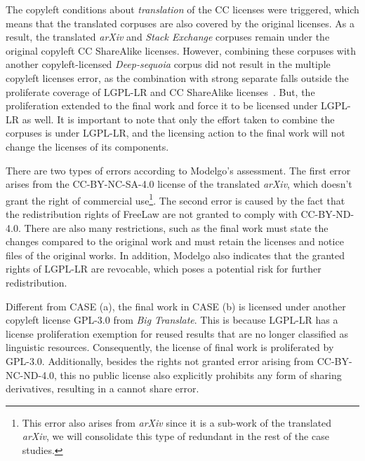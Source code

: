 The copyleft conditions about \textit{translation} of the CC licenses were triggered, which means that the translated corpuses are also covered by the original licenses.
As a result, the translated \textit{arXiv} and \textit{Stack Exchange} corpuses remain under the original copyleft CC ShareAlike licenses. 
However, combining these corpuses with another copyleft-licensed \textit{Deep-sequoia} corpus did not result in the multiple copyleft licenses error, as the combination with strong separate falls outside the proliferate coverage of LGPL-LR and CC ShareAlike licenses~\cite{creative2023artificial}.
But, the proliferation extended to the final work and force it to be licensed under LGPL-LR as well.
It is important to note that only the effort taken to combine the corpuses is under LGPL-LR, and the licensing action to the final work will not change the licenses of its components.

There are two types of errors according to Modelgo's assessment.
The first error arises from the CC-BY-NC-SA-4.0 license of the translated \textit{arXiv}, which doesn't grant the right of commercial use\footnote{This error also arises from \textit{arXiv} since it is a sub-work of the translated \textit{arXiv}, we will consolidate this type of redundant in the rest of the case studies.}. 
The second error is caused by the fact that the redistribution rights of FreeLaw are not granted to comply with CC-BY-ND-4.0.
There are also many restrictions, such as the final work must state the changes compared to the original work and must retain the licenses and notice files of the original works.
In addition, Modelgo also indicates that the granted rights of LGPL-LR are revocable, which poses a potential risk for further redistribution.

Different from CASE  (a), the final work in CASE  (b) is licensed under another copyleft license GPL-3.0 from \textit{Big Translate}.
This is because LGPL-LR has a license proliferation exemption for reused results that are no longer classified as linguistic resources.
Consequently, the license of final work is proliferated by GPL-3.0.
Additionally, besides the rights not granted error arising from CC-BY-NC-ND-4.0, this no public license also explicitly prohibits any form of sharing derivatives, resulting in a cannot share error.



